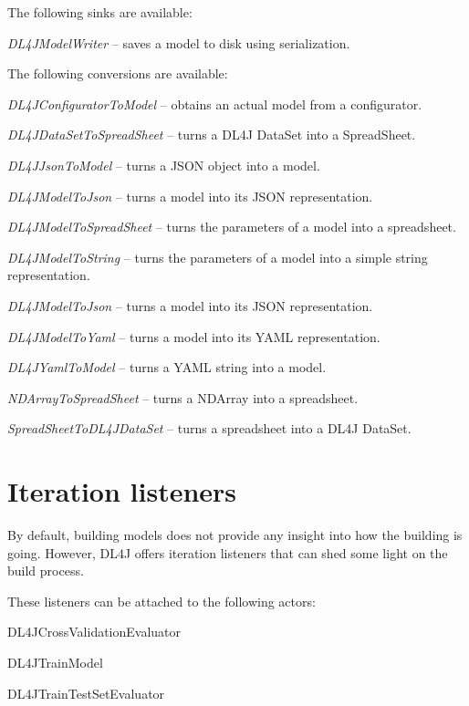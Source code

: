 \documentclass[a4paper]{book}
\begin{document}
The following sinks are available:
\begin{tight_itemize}
  \item \textit{DL4JModelWriter} -- saves a model to disk using serialization.
\end{tight_itemize}

The following conversions are available:
\begin{tight_itemize}
  \item \textit{DL4JConfiguratorToModel} -- obtains an actual model from a configurator.
  \item \textit{DL4JDataSetToSpreadSheet} -- turns a DL4J DataSet into a SpreadSheet.
  \item \textit{DL4JJsonToModel} -- turns a JSON\cite{json} object into a model.
  \item \textit{DL4JModelToJson} -- turns a model into its JSON\cite{json} representation.
  \item \textit{DL4JModelToSpreadSheet} -- turns the parameters of a model into a spreadsheet.
  \item \textit{DL4JModelToString} -- turns the parameters of a model into a simple string representation.
  \item \textit{DL4JModelToJson} -- turns a model into its JSON\cite{json} representation.
  \item \textit{DL4JModelToYaml} -- turns a model into its YAML\cite{yaml} representation.
  \item \textit{DL4JYamlToModel} -- turns a YAML\cite{yaml} string into a model.
  \item \textit{NDArrayToSpreadSheet} -- turns a NDArray into a spreadsheet.
  \item \textit{SpreadSheetToDL4JDataSet} -- turns a spreadsheet into a DL4J DataSet.
\end{tight_itemize}

\section{Iteration listeners}
By default, building models does not provide any insight into how the building
is going. However, DL4J offers iteration listeners that can shed some light
on the build process.

These listeners can be attached to the following actors:
\begin{tight_itemize}
  \item DL4JCrossValidationEvaluator
  \item DL4JTrainModel
  \item DL4JTrainTestSetEvaluator
\end{tight_itemize}
\end{document}

